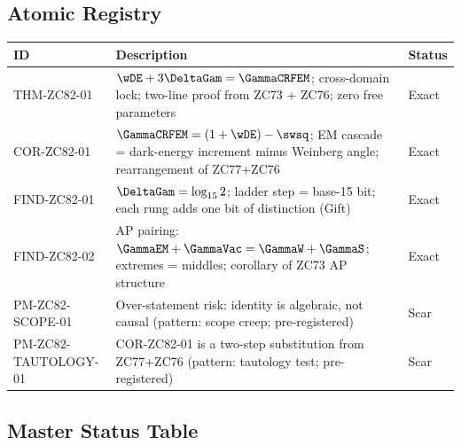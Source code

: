 \documentclass[12pt, a4paper]{article}
\begin{document}
\subsection{Atomic Registry}
\label{sec:registry}

\begin{formalbox}[title={Atomic Registry --- ZC82}]
\begin{center}
\renewcommand{\arraystretch}{1.3}
\small
\begin{tabular}{lp{7.6cm}l}
\toprule
\textbf{ID} & \textbf{Description} & \textbf{Status} \\
\midrule
THM-ZC82-01
  & $\wDE + 3\DeltaGam = \GammaCRFEM$; cross-domain lock;
    two-line proof from ZC73 + ZC76; zero free parameters
  & Exact \\[3pt]
COR-ZC82-01
  & $\GammaCRFEM = (1+\wDE) - \swsq$; EM cascade = dark-energy
    increment minus Weinberg angle; rearrangement of ZC77+ZC76
  & Exact \\[3pt]
FIND-ZC82-01
  & $\DeltaGam = \log_{15}2$; ladder step = base-15 bit;
    each rung adds one bit of distinction (Gift)
  & Exact \\[3pt]
FIND-ZC82-02
  & AP pairing: $\GammaEM+\GammaVac = \GammaW+\GammaS$;
    extremes = middles; corollary of ZC73 AP structure
  & Exact \\[3pt]
PM-ZC82-SCOPE-01
  & Over-statement risk: identity is algebraic, not causal
    (pattern: scope creep; pre-registered)
  & Scar \\[3pt]
PM-ZC82-TAUTOLOGY-01
  & COR-ZC82-01 is a two-step substitution from ZC77+ZC76
    (pattern: tautology test; pre-registered)
  & Scar \\[3pt]
\bottomrule
\end{tabular}
\end{center}
\end{formalbox}

\subsection{Master Status Table}
\label{sec:status}
\end{document}

